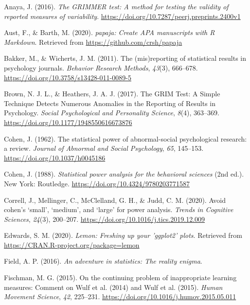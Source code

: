 \documentclass[
  english,
  man, donotrepeattitle,floatsintext]{apa7}
\newlength{\cslhangindent}
\newlength{\cslentryspacingunit} %
\newenvironment{CSLReferences}[2] %
 {%
  \setlength{\parindent}{0pt}
  \ifodd #1
  \let\oldpar\par
  \def\par{\hangindent=\cslhangindent\oldpar}
  \fi
  \setlength{\parskip}{#2\cslentryspacingunit}
 }%
 {}
\begin{document}
\hypertarget{refs}{}
\begin{CSLReferences}{1}{0}
\leavevmode{}%
Anaya, J. (2016). \emph{The GRIMMER test: A method for testing the validity of reported measures of variability}. \url{https://doi.org/10.7287/peerj.preprints.2400v1}

\leavevmode{}%
Aust, F., \& Barth, M. (2020). \emph{{papaja}: {Create} {APA} manuscripts with {R Markdown}}. Retrieved from \url{https://github.com/crsh/papaja}

\leavevmode{}%
Bakker, M., \& Wicherts, J. M. (2011). The (mis)reporting of statistical results in psychology journals. \emph{Behavior Research Methods}, \emph{43}(3), 666--678. \url{https://doi.org/10.3758/s13428-011-0089-5}

\leavevmode{}%
Brown, N. J. L., \& Heathers, J. A. J. (2017). The GRIM Test: A Simple Technique Detects Numerous Anomalies in the Reporting of Results in Psychology. \emph{Social Psychological and Personality Science}, \emph{8}(4), 363--369. \url{https://doi.org/10.1177/1948550616673876}

\leavevmode{}%
Cohen, J. (1962). The statistical power of abnormal-social psychological research: a review. \emph{Journal of Abnormal and Social Psychology}, \emph{65}, 145--153. \url{https://doi.org/10.1037/h0045186}

\leavevmode{}%
Cohen, J. (1988). \emph{Statistical power analysis for the behavioral sciences} (2nd ed.). New York: Routledge. \url{https://doi.org/10.4324/9780203771587}

\leavevmode{}%
Correll, J., Mellinger, C., McClelland, G. H., \& Judd, C. M. (2020). Avoid cohen{'}s {`}small{'}, {`}medium{'}, and {`}large{'} for power analysis. \emph{Trends in Cognitive Sciences}, \emph{24}(3), 200--207. \url{https://doi.org/10.1016/j.tics.2019.12.009}

\leavevmode{}%
Edwards, S. M. (2020). \emph{Lemon: Freshing up your 'ggplot2' plots}. Retrieved from \url{https://CRAN.R-project.org/package=lemon}

\leavevmode{}%
Field, A. P. (2016). \emph{An adventure in statistics: The reality enigma}.

\leavevmode{}%
Fischman, M. G. (2015). On the continuing problem of inappropriate learning measures: Comment on Wulf et al. (2014) and Wulf et al. (2015). \emph{Human Movement Science}, \emph{42}, 225--231. \url{https://doi.org/10.1016/j.humov.2015.05.011}


\end{CSLReferences}
\end{document}
